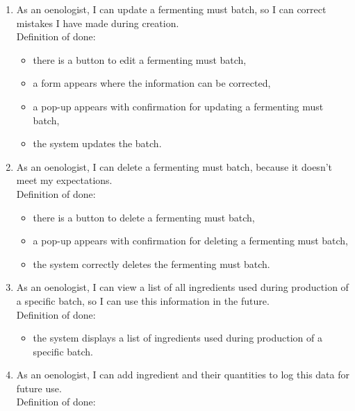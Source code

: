 \begin{enumerate}
\begin{itemize}
		\item there is a button to confirm the creation of a new fermenting must batch,
		\item a pop-up appears with confirmation for creating a new fermenting must batch,
		\item the system automatically generates a batch number.
	\end{itemize}
	\item As an oenologist, I can update a fermenting must batch, so I can correct mistakes I have made during creation.
	\\Definition of done:
	\begin{itemize}
		\item there is a button to edit a fermenting must batch,
		\item a form appears where the information can be corrected,
		\item a pop-up appears with confirmation for updating a fermenting must batch,
		\item the system updates the batch.
	\end{itemize}
	\item As an oenologist, I can delete a fermenting must batch, because it doesn't meet my expectations.
	\\Definition of done:
	\begin{itemize}
		\item there is a button to delete a fermenting must batch,
		\item a pop-up appears with confirmation for deleting a fermenting must batch,
		\item the system correctly deletes the fermenting must batch.
	\end{itemize}
	\item As an oenologist, I can view a list of all ingredients used during production of a specific batch, so I can use this information in the future.
	\\Definition of done:
	\begin{itemize}
		\item the system displays a list of ingredients used during production of a specific batch.
	\end{itemize}
	\item As an oenologist, I can add ingredient and their quantities to log this data for future use.
	\\Definition of done:

\end{enumerate}
